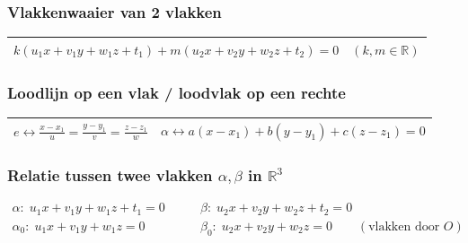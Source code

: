 \documentclass[a5paper]{article}
\begin{document}
\subsubsection{Vlakkenwaaier van 2 vlakken}

\begin{table}[h!]
\centering
\begin{tabular}{|c|}
\hline
$
k(u_1x + v_1y + w_1z + t_1) + m(u_2x + v_2y + w_2z + t_2) = 0 
\quad (k, m \in \mathbb{R})
$
\\
\hline
\end{tabular}
\end{table}

\subsubsection{Loodlijn op een vlak / loodvlak op een rechte}

\begin{table}[h!]
\centering
\begin{tabular}{|c|c|}
\hline
$
e \leftrightarrow
\frac{x - x_1}{u}
=
\frac{y - y_1}{v}
=
\frac{z - z_1}{w}
$
& 
$
\alpha \leftrightarrow a(x - x_1) + b(y - y_1) + c(z - z_1) = 0
$
\\
\hline
\end{tabular}
\end{table}




\newpage

\subsubsection{Relatie tussen twee vlakken $\alpha,\beta$ in $\mathbb{R}^3$}
\[
\begin{aligned}
\alpha:\; u_1 x + v_1 y + w_1 z + t_1 = 0
&\qquad
\beta:\; u_2 x + v_2 y + w_2 z + t_2 = 0 \\[2mm]
\alpha_{0}:\; u_1 x + v_1 y + w_1 z = 0
&\qquad
\beta_{0}:\; u_2 x + v_2 y + w_2 z = 0
\qquad(\text{vlakken door }O)
\end{aligned}
\]
\end{document}
